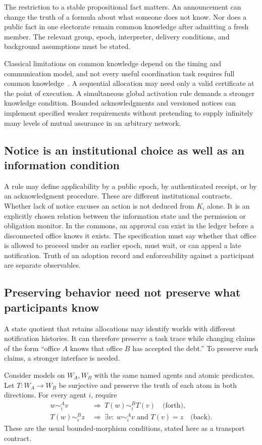 The restriction to a stable propositional fact matters. An announcement can change the truth of a formula about what someone does not know. Nor does a public fact in one electorate remain common knowledge after admitting a fresh member. The relevant group, epoch, interpreter, delivery conditions, and background assumptions must be stated.

Classical limitations on common knowledge depend on the timing and communication model, and not every useful coordination task requires full common knowledge~\cite{MS:halpernmoses}. A sequential allocation may need only a valid certificate at the point of execution. A simultaneous global activation rule demands a stronger knowledge condition. Bounded acknowledgments and versioned notices can implement specified weaker requirements without pretending to supply infinitely many levels of mutual assurance in an arbitrary network.

\subsection{Notice is an institutional choice as well as an information condition}
A rule may define applicability by a public epoch, by authenticated receipt, or by an acknowledgment procedure. These are different institutional contracts. Whether lack of notice excuses an action is not deduced from $K_i$ alone. It is an explicitly chosen relation between the information state and the permission or obligation monitor. In the commons, an approval can exist in the ledger before a disconnected office knows it exists. The specification must say whether that office is allowed to proceed under an earlier epoch, must wait, or can appeal a late notification. Truth of an adoption record and enforceability against a participant are separate observables.

\subsection{Preserving behavior need not preserve what participants know}
A state quotient that retains allocations may identify worlds with different notification histories. It can therefore preserve a task trace while changing claims of the form ``office $A$ knows that office $B$ has accepted the debt.'' To preserve such claims, a stronger interface is needed.

Consider models on $W_A,W_B$ with the same named agents and atomic predicates. Let $T:W_A\to W_B$ be surjective and preserve the truth of each atom in both directions. For every agent $i$, require
\begin{align*}
w\sim_i^A v&\ \Longrightarrow\ T(w)\sim_i^B T(v) \quad\text{(forth)},\\
T(w)\sim_i^B z&\ \Longrightarrow\ \exists v:\ w\sim_i^A v\text{ and }T(v)=z
\quad\text{(back)}.
\end{align*}
These are the usual bounded-morphism conditions, stated here as a transport contract.

